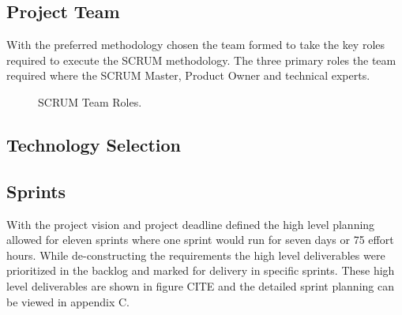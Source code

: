 \documentclass[12pt]{witseiepaper}
\begin{document}
\subsection{Project Team}

With the preferred methodology chosen the team formed to take the key roles required to execute the SCRUM methodology. The three primary roles the team required where the SCRUM Master, Product Owner and technical experts.\\

\begin{figure}[H]
	\caption{SCRUM Team Roles.} 
	\label{fig:SCRUMTeam}
\end{figure}


\subsection{Technology Selection}


\subsection{Sprints}
With the project vision and project deadline defined the high level planning allowed for eleven sprints \cite{ExpertJudgement} where one sprint would run for seven days or 75 effort hours. While de-constructing the requirements the high level deliverables were prioritized in the backlog and marked for delivery in specific sprints. These high level deliverables are shown in figure CITE and the detailed sprint planning can be viewed in appendix C.
\end{document}
